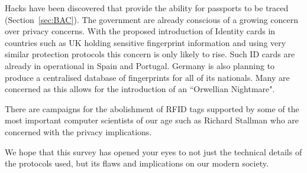 \documentclass[12pt]{article}
\begin{document}
Hacks have been discovered that provide the ability for passports to be traced (Section~\ref{sec:BAC}). The government are already conscious of a growing concern over privacy concerns. With the proposed introduction of Identity cards in countries such as UK \cite{JRC:2008ws} holding sensitive fingerprint information and using very similar protection protocols this concern is only likely to rise. Such ID cards are already in operational in Spain and Portugal. Germany is also planning to produce a centralised database of fingerprints for all of its nationals. Many are concerned as this allows for the introduction of an ``Orwellian Nightmare".

There are campaigns for the abolishment of RFID tags supported by some of the most important computer scientists of our age such as Richard Stallman who are concerned with the privacy implications.

We hope that this survey has opened your eyes to not just the technical details of the protocols used, but its flaws and implications on our modern society.
\cleardoublepage


 










\end{document}
